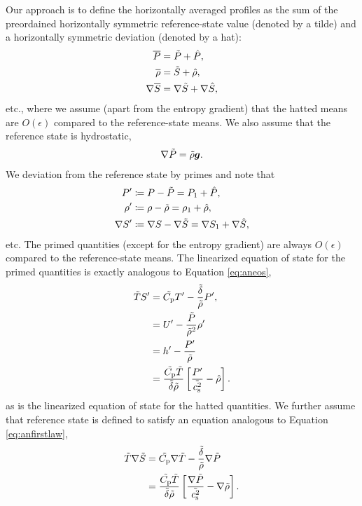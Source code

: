 \documentclass[12pt]{article}
\begin{document}
Our approach is to define the horizontally averaged profiles as the sum of the preordained horizontally symmetric reference-state value (denoted by a tilde) and a horizontally symmetric deviation (denoted by a hat):
\begin{align}
	\overline{P} &= \tilde{P} + \hat{P},\\
	\overline{\rho} &= \tilde{S} + \hat{\rho},\\
	\nabla\overline{S} &= \nabla \tilde{S} + \nabla \hat{S},
\end{align}
etc., where we assume (apart from the entropy gradient) that the hatted means are $O(\epsilon)$ compared to the reference-state means. We also assume that the reference state is hydrostatic,
\begin{align}\label{eq:refhydro}
	\nabla \tilde{P} = \tilde{\rho}\bm{g}.
\end{align}
We deviation from the reference state by primes and note that 
\begin{align}
	P^\prime & \coloneqq P - \tilde{P} = P_1 + \hat{P},\\
	\rho^\prime & \coloneqq \rho - \tilde{\rho} = \rho_1 + \hat{\rho},\\
	\nabla S^\prime & \coloneqq \nabla S - \nabla \tilde{S} = \nabla S_1 + \nabla \hat{S},
\end{align}
etc. The primed quantities (except for the entropy gradient) are always $O(\epsilon)$ compared to the reference-state means. The linearized equation of state for the primed quantities is exactly analogous to Equation \eqref{eq:aneos},
\begin{subequations}\label{eq:aneosref}
	\begin{align}
		\tilde{T} S^\prime &= \tilde{C_{\rm{p}}} T^\prime - \frac{\tilde{\delta}}{\tilde{\rho}} P^\prime,\\
		&= U^\prime - \frac{\tilde{P}}{\tilde{\rho}^2}\rho^\prime \\
	&= h^\prime - \frac{P^\prime }{\tilde{\rho}}\\
		&= \frac{\tilde{C_{\rm{p}}} \tilde{T}}{\tilde{\delta}\tilde{\rho}}\left[\frac{P^\prime}{\tilde{c_{\rm s}^2}}-\hat{\rho}\right].
	\end{align}
\end{subequations}
as is the linearized equation of state for the hatted quantities. We further assume that reference state is defined to satisfy an equation analogous to Equation \eqref{eq:anfirstlaw},
\begin{subequations}\label{eq:anfirstlawref}
	\begin{align}
		\tilde{T}\nabla\tilde{S} &= \tilde{C_{\rm{p}}}\nabla\tilde{T} - \frac{\tilde{\delta}}{\tilde{\rho}}\nabla\tilde{P} \\
		&= \frac{\tilde{C_{\rm{p}}}\tilde{T}}{\tilde{\delta}\tilde{\rho}}\left[\frac{\nabla\tilde{P}}{\tilde{c_{\rm s}^2}}-\nabla\tilde{\rho}\right].
	\end{align}
\end{subequations}
\end{document}
